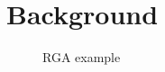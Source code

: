\section{Background}
\label{sect.background}

\begin{figure}
\centering

\caption{RGA example}\label{fig.two-lists}
\end{figure}
